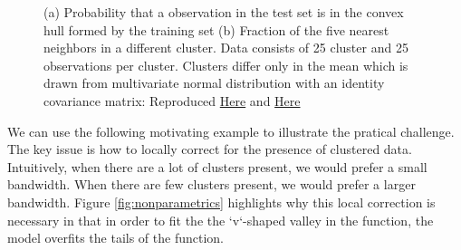 \documentclass[a4paper,12pt]{article}
\begin{document}
\begin{figure}[htbp]
\begin{subfigure}{.48\textwidth}
    \caption{}
    \label{fig:highb}
\end{subfigure}
\caption{(a) Probability that a observation in the test set is in the convex hull formed by the training set (b)  Fraction of the five nearest neighbors in a different cluster. Data consists of 25 cluster and 25 observations per cluster. Clusters differ only in the mean which is drawn from multivariate normal distribution with an identity covariance matrix: Reproduced \href{https://github.com/pharringtonp19/rfp/blob/main/notebooks/How_Input_Normalization_Changes_Our_Understanding_of_Interpolation_vs_Extrapolation_With_Clusters.ipynb}{Here} and  \href{https://github.com/pharringtonp19/rfp/blob/main/notebooks/Nearest_Neighbors_Example.ipynb}{Here}}
\label{fig:high}
\end{figure} \par 
We can use the following motivating example to illustrate the pratical challenge. The key issue is how to locally correct for the presence of clustered data. Intuitively, when there are a lot of clusters present, we would prefer a small bandwidth. When there are few clusters present, we would prefer a larger bandwidth. Figure \ref{fig:nonparametrics}
highlights why this local correction is necessary in that in order to fit the the `v`-shaped valley in the function, the model overfits the tails of the function.
\end{document}
